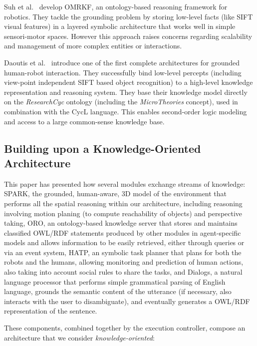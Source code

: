 \documentclass{svmult}
\begin{document}
Suh et al.~\cite{Suh2007} develop {\sc OMRKF}, an ontology-based reasoning
framework for robotics. They tackle the grounding problem by storing low-level
facts (like SIFT visual features) in a layered symbolic architecture that works
well in simple sensori-motor spaces. However this approach raises concerns
regarding scalability and management of more complex entities or interactions.

Daoutis et al.~\cite{Daoutis2009} introduce one of the first complete
architectures for grounded human-robot interaction. They successfully bind
low-level percepts (including view-point independent SIFT based object
recognition) to a high-level knowledge representation and reasoning system.
They base their knowledge model directly on the \textit{ResearchCyc} ontology
(including the \textit{MicroTheories} concept), used in combination with the
{\sc CycL} language. This enables second-order logic modeling and access to a
large common-sense knowledge base.


\subsection{Building upon a Knowledge-Oriented Architecture}

This paper has presented how several modules exchange streams of knowledge:
{\sc SPARK}, the grounded, human-aware, 3D model of the environment that
performs all the spatial reasoning within our architecture, including reasoning
involving motion planing (to compute reachability of objects) and perspective
taking, {\sc ORO}, an ontology-based knowledge server that stores and maintains
classified OWL/RDF statements produced by other modules in agent-specific
models and allows information to be easily retrieved, either through queries or
via an event system, {\sc HATP}, an symbolic task planner that plans for both
the robots and the humans, allowing monitoring and prediction of human actions,
also taking into account social rules to share the tasks, and  {\sc Dialogs}, a
natural language processor that performs simple grammatical parsing of English
language, grounds the semantic content of the utterance (if necessary, also
interacts with the user to disambiguate), and eventually generates a OWL/RDF
representation of the sentence.

These components, combined together by the execution controller, compose
an architecture that we consider \emph{knowledge-oriented}:
\end{document}
